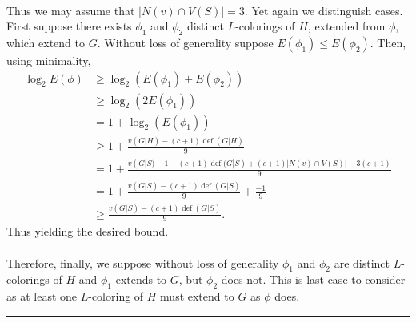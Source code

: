 \documentclass[letterpaper,12pt,oneside,onecolumn]{article}
\newenvironment{proof}{{\bf Proof:  }}{\hfill\rule{2mm}{2mm}}
\DeclareMathOperator{\defi}{def}
\begin{document}
\begin{proof}
	\paragraph{}
	Thus we may assume that $|N(v) \cap V(S)| = 3$. Yet again we distinguish cases. First suppose there exists $\phi_1$ and $\phi_2$ distinct $L$-colorings of $H$, extended from $\phi$, which extend to $G$. Without loss of generality suppose $E(\phi_1) \leq E(\phi_2)$. Then, using minimality,
	\begin{align*}
	\log_2E(\phi) &\geq \log_2(E(\phi_1) + E(\phi_2)) \\
	&\geq \log_2(2E(\phi_1))\\
	&= 1 + \log_2(E(\phi_1))\\
	&\geq 1+ \frac{v(G|H) - (c+1)\defi(G|H)}{9}\\
	&= 1 + \frac{v(G|S) - 1 -(c+1)\defi(G|S) +(c+1)|N(v)\cap V(S)| - 3(c+1)}{9}\\
	&= 1 + \frac{v(G|S) -(c+1)\defi(G|S)}{9} + \frac{-1}{9} \\
	&\geq \frac{v(G|S) -(c+1)\defi(G|S)}{9}.
	\end{align*}
	Thus yielding the desired bound.
	\paragraph{}
	Therefore, finally, we suppose without loss of generality $\phi_1$ and $\phi_2$ are distinct $L$-colorings of $H$ and $\phi_1$ extends to $G$, but $\phi_2$ does not. This is last case to consider as at least one $L$-coloring of $H$ must extend to $G$ as $\phi$ does.

\end{proof}
\end{document}
